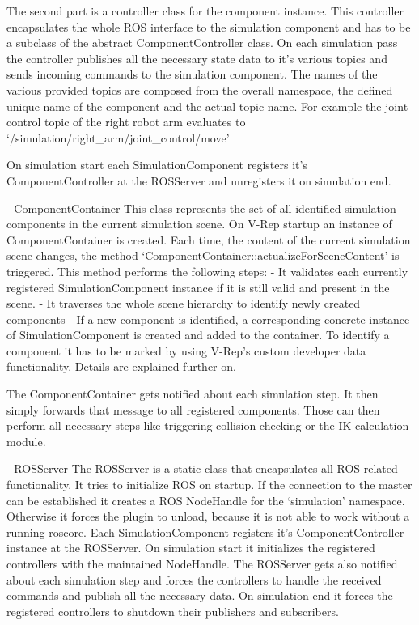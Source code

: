   The second part is a controller class for the component instance. This controller encapsulates the
  whole ROS interface to the simulation component and has to be a subclass of the abstract 
  ComponentController class. On each simulation pass the controller publishes all the necessary
  state data to it's various topics and sends incoming commands to the simulation component. The
  names of the various provided topics are composed from the overall namespace, the defined unique
  name of the component and the actual topic name. For example the joint control topic of the right
  robot arm evaluates to `/simulation/right\_arm/joint\_control/move'
  
  On simulation start each SimulationComponent registers it's ComponentController at the ROSServer
  and unregisters it on simulation end.
  
- ComponentContainer
  This class represents the set of all identified simulation components in the current simulation
  scene. On V-Rep startup an instance of ComponentContainer is created. Each time, the content of
  the current simulation scene changes, the method `ComponentContainer::actualizeForSceneContent' 
  is triggered. This method performs the following steps:
  - It validates each currently registered SimulationComponent instance if it is still valid and
    present in the scene.
  - It traverses the whole scene hierarchy to identify newly created components
  - If a new component is identified, a corresponding concrete instance of SimulationComponent 
    is created and added to the container.
  To identify a component it has to be marked by using V-Rep's custom developer data functionality.
  Details are explained further on.
  
  The ComponentContainer gets notified about each simulation step. It then simply forwards that
  message to all registered components. Those can then perform all necessary steps like triggering
  collision checking or the IK calculation module.
  
- ROSServer
  The ROSServer is a static class that encapsulates all ROS related functionality. It tries to 
  initialize ROS on startup. If the connection to the master can be established it creates a
  ROS NodeHandle for the `simulation' namespace. Otherwise it forces the plugin to unload, because
  it is not able to work without a running roscore.
  Each SimulationComponent registers it's ComponentController instance at the ROSServer. On 
  simulation start it initializes the registered controllers with the maintained NodeHandle. The
  ROSServer gets also notified about each simulation step and forces the controllers to handle the
  received commands and publish all the necessary data.
  On simulation end it forces the registered controllers to shutdown their publishers and 
  subscribers.
  
